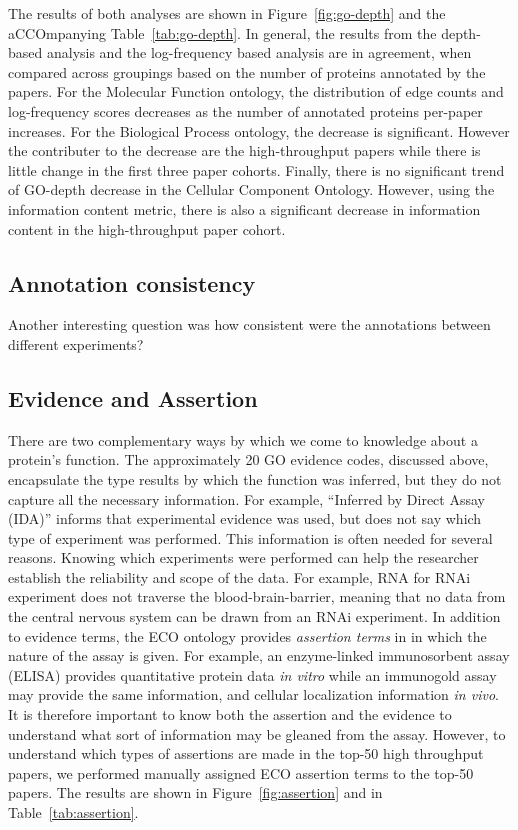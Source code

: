 \documentclass[12pt]{article}
\begin{document}
The results of both analyses are shown in Figure~\ref{fig:go-depth} and the aCCOmpanying
Table~\ref{tab:go-depth}. In general, the results from the depth-based analysis and the
log-frequency based analysis are in agreement, when compared across groupings based on the
number of proteins annotated by the papers. For the Molecular Function ontology, the
distribution of edge counts and log-frequency scores decreases as the number of annotated
proteins per-paper increases.  For the Biological Process ontology, the decrease is
significant. However the contributer to the decrease are the high-throughput papers
while there is little change in the first three paper cohorts.
Finally, there is no significant trend of GO-depth decrease in the Cellular Component
Ontology. However, using the information content metric, there is also a significant decrease
in information content in the high-throughput paper cohort.

\subsection*{Annotation consistency}
Another interesting question was how consistent were the annotations between different experiments?


\subsection*{Evidence and Assertion}

There are two complementary ways by which we come to knowledge about a protein's function.
The approximately 20 GO evidence codes, discussed above, encapsulate the type results by
which the function was inferred, but they do not capture all the necessary information. For
example, ``Inferred by Direct Assay (IDA)'' informs that experimental evidence was used, but
does not say which type of experiment was performed. This information is often needed for
several reasons. Knowing which experiments were performed can help the researcher establish
the reliability and scope of the data. For example, RNA for RNAi experiment does not
traverse the blood-brain-barrier, meaning that no data from the central nervous system
can be drawn from an RNAi experiment.
 In addition to evidence terms, the ECO ontology provides \textit{assertion terms} in
in which the nature of the assay is given. For example, an
enzyme-linked immunosorbent assay (ELISA) provides quantitative protein data \textit{in
vitro} while an immunogold assay may provide the same information, and cellular localization
information \textit{in vivo}. It is therefore important to know both the assertion and the
evidence to understand what sort of information may be gleaned from the assay.  However, to
understand which types of assertions are made in the top-50 high throughput papers, we
performed manually assigned ECO assertion terms to the top-50 papers. The results are shown
in Figure~\ref{fig:assertion} and in Table~\ref{tab:assertion}.
\end{document}
